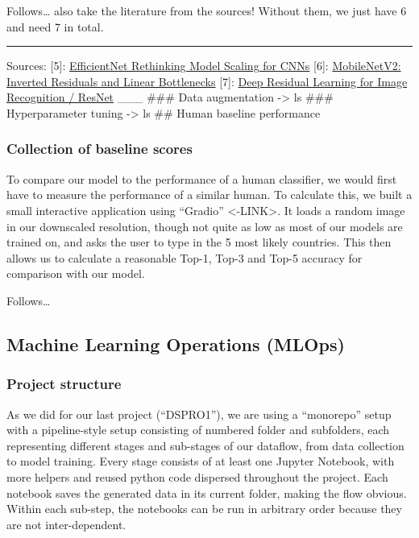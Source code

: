 \documentclass{article}
\begin{document}
Follows\ldots{} also take the literature from the sources! Without them,
we just have 6 and need 7 in total.

\begin{center}\rule{0.5\linewidth}{0.5pt}\end{center}

Sources: {[}5{]}: \href{https://arxiv.org/abs/1905.11946}{EfficientNet
Rethinking Model Scaling for CNNs} {[}6{]}:
\href{https://arxiv.org/abs/1801.04381}{MobileNetV2: Inverted Residuals
and Linear Bottlenecks} {[}7{]}:
\href{https://arxiv.org/abs/1512.03385}{Deep Residual Learning for Image
Recognition / ResNet} \_\_\_ \#\#\# Data augmentation -\textgreater{} ls
\#\#\# Hyperparameter tuning -\textgreater{} ls \#\# Human baseline
performance

\subsubsection{Collection of baseline
scores}\label{collection-of-baseline-scores}

To compare our model to the performance of a human classifier, we would
first have to measure the performance of a similar human. To calculate
this, we built a small interactive application using ``Gradio''
\textless-LINK\textgreater. It loads a random image in our downscaled
resolution, though not quite as low as most of our models are trained
on, and asks the user to type in the 5 most likely countries. This then
allows us to calculate a reasonable Top-1, Top-3 and Top-5 accuracy for
comparison with our model.

Follows\ldots{}

\subsection{Machine Learning Operations
(MLOps)}\label{machine-learning-operations-mlops}

\subsubsection{Project structure}\label{project-structure}

As we did for our last project (``DSPRO1''), we are using a ``monorepo''
setup with a pipeline-style setup consisting of numbered folder and
subfolders, each representing different stages and sub-stages of our
dataflow, from data collection to model training. Every stage consists
of at least one Jupyter Notebook, with more helpers and reused python
code dispersed throughout the project. Each notebook saves the generated
data in its current folder, making the flow obvious. Within each
sub-step, the notebooks can be run in arbitrary order because they are
not inter-dependent.
\end{document}
